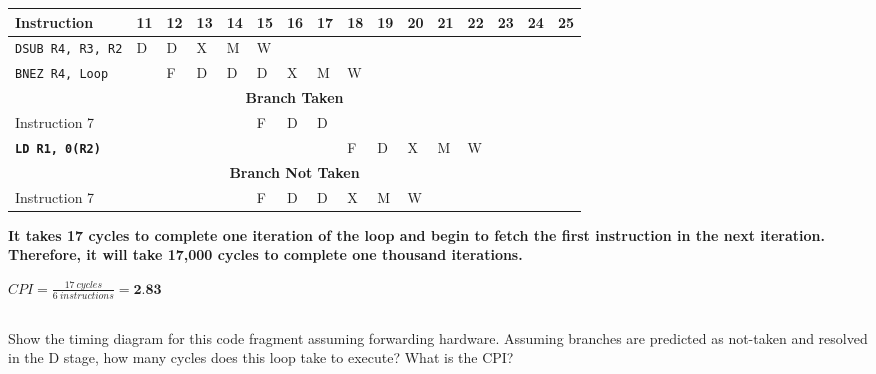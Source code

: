 \documentclass{article}
\begin{document}
\begin{adjustwidth}{2.5em}{0pt}
\vspace{5mm}
\begin{tabular}{|p{3cm}|p{.2cm}|p{.2cm}|p{.2cm}|p{.2cm}|p{.2cm}|p{.2cm}|p{.2cm}|p{.2cm}|p{.2cm}|p{.2cm}|p{.2cm}|p{.2cm}|p{.2cm}|p{.2cm}|p{.2cm}|}
\hline
\textbf{Instruction} &\textbf{11}&\textbf{12}&\textbf{13}&\textbf{14}& \textbf{15} & \textbf{16} & \textbf{17} & \textbf{18} & \textbf{19}&\textbf{20}&\textbf{21}&\textbf{22}&\textbf{23}&\textbf{24}&\textbf{25}\\
\hline
	\texttt{DSUB R4, R3, R2} & D & D & X & M & W & & & & & & & & & &   \\
\texttt{BNEZ R4, Loop} & & F& D& D& D& X& M& W& & & & & & & \\
\hline
\multicolumn{16}{|c|}{\textbf{Branch Taken}}\\
\hline
Instruction 7 & & & & & F & D& D& & & & & & & &\\
\textbf{\texttt{LD R1, 0(R2)}} & & & & & & & & F& D & X& M& W& & &\\
\hline
\multicolumn{16}{|c|}{\textbf{Branch Not Taken}}\\
\hline
Instruction 7  & & & & & F& D& D& X& M& W& & & & & \\
\hline
\end{tabular}

\vspace{5mm}
\textbf{It takes 17 cycles to complete one iteration of the loop and begin to fetch the first instruction in the next iteration. Therefore, it will take 17,000 cycles to complete one thousand iterations.}


\vspace{3mm}
$CPI=\frac{17\ cycles}{6\ instructions}=\textbf{2.83}$
\subsection{} 
Show the timing diagram for this code fragment assuming forwarding hardware. Assuming branches are predicted as not-taken and resolved in the D stage, how many cycles does this loop take to execute? What is the CPI?


\end{adjustwidth}
\end{document}
